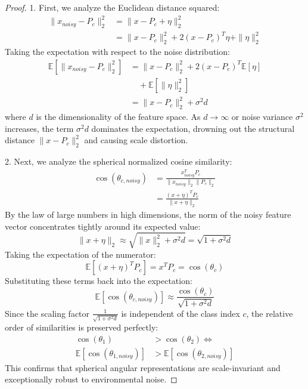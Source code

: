\documentclass{article}
\theoremstyle{definition}
\theoremstyle{remark}
\begin{document}
\begin{proof}
1. First, we analyze the Euclidean distance squared:
\begin{align}
\|x_{noisy} - P_c\|_2^2 &= \|x - P_c + \eta\|_2^2 \\
&= \|x - P_c\|_2^2 + 2(x - P_c)^T \eta + \|\eta\|_2^2
\end{align}
Taking the expectation with respect to the noise distribution:
\begin{align}
\mathbb{E}[\|x_{noisy} - P_c\|_2^2] &= \|x - P_c\|_2^2 + 2(x - P_c)^T \mathbb{E}[\eta] \nonumber \\
&\quad + \mathbb{E}[\|\eta\|_2^2] \\
&= \|x - P_c\|_2^2 + \sigma^2 d
\end{align}
where $d$ is the dimensionality of the feature space. As $d \to \infty$ or noise variance $\sigma^2$ increases, the term $\sigma^2 d$ dominates the expectation, drowning out the structural distance $\|x - P_c\|_2^2$ and causing scale distortion.

2. Next, we analyze the spherical normalized cosine similarity:
\begin{equation}
\begin{split}
\cos(\theta_{c, noisy}) &= \frac{x_{noisy}^T P_c}{\|x_{noisy}\|_2 \|P_c\|_2} \\
&= \frac{(x + \eta)^T P_c}{\|x + \eta\|_2}
\end{split}
\end{equation}
By the law of large numbers in high dimensions, the norm of the noisy feature vector concentrates tightly around its expected value:
\begin{equation}
\|x + \eta\|_2 \approx \sqrt{\|x\|_2^2 + \sigma^2 d} = \sqrt{1 + \sigma^2 d}
\end{equation}
Taking the expectation of the numerator:
\begin{equation}
\mathbb{E}[(x + \eta)^T P_c] = x^T P_c = \cos(\theta_c)
\end{equation}
Substituting these terms back into the expectation:
\begin{equation}
\mathbb{E}[\cos(\theta_{c, noisy})] \approx \frac{\cos(\theta_c)}{\sqrt{1 + \sigma^2 d}}
\end{equation}
Since the scaling factor $\frac{1}{\sqrt{1 + \sigma^2 d}}$ is independent of the class index $c$, the relative order of similarities is preserved perfectly:
\begin{equation}
\begin{split}
\cos(\theta_{1}) &> \cos(\theta_{2}) \iff \\
\mathbb{E}[\cos(\theta_{1, noisy})] &> \mathbb{E}[\cos(\theta_{2, noisy})]
\end{split}
\end{equation}
This confirms that spherical angular representations are scale-invariant and exceptionally robust to environmental noise.
\end{proof}
\end{document}
